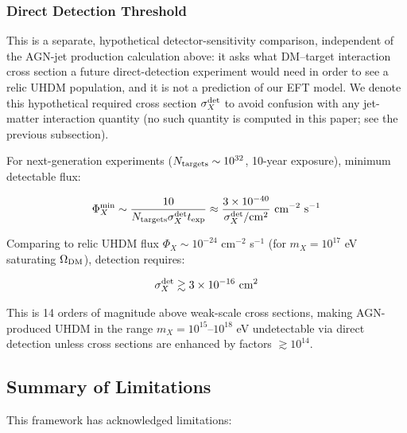 \documentclass[twocolumn,superscriptaddress,prd,nofootinbib]{revtex4-2}
\begin{document}
\subsubsection{Direct Detection Threshold}

This is a separate, hypothetical detector-sensitivity comparison, independent of the AGN-jet production calculation above: it asks what DM--target interaction cross section a future direct-detection experiment would need in order to see a relic UHDM population, and it is not a prediction of our EFT model. We denote this hypothetical required cross section $\sigma_X^{\rm det}$ to avoid confusion with any jet-matter interaction quantity (no such quantity is computed in this paper; see the previous subsection).

For next-generation experiments ($N_{\rm targets} \sim 10^{32}$, 10-year exposure), minimum detectable flux:

\begin{equation}
\Phi_X^{\rm min} \sim \frac{10}{N_{\rm targets} \sigma_X^{\rm det} t_{\rm exp}} \approx \frac{3 \times 10^{-40}}{\sigma_X^{\rm det}/{\rm cm}^2} \text{ cm}^{-2} \text{ s}^{-1}
\label{eq:flux_threshold}
\end{equation}

Comparing to relic UHDM flux $\Phi_X \sim 10^{-24}$ cm$^{-2}$ s$^{-1}$ (for $m_X = 10^{17}$ eV saturating $\Omega_{\rm DM}$), detection requires:

\begin{equation}
\sigma_X^{\rm det} \gtrsim 3 \times 10^{-16} \text{ cm}^2
\label{eq:sigma_threshold}
\end{equation}

This is 14 orders of magnitude above weak-scale cross sections, making AGN-produced UHDM in the range $m_X = 10^{15}$--$10^{18}$ eV undetectable via direct detection unless cross sections are enhanced by factors $\gtrsim 10^{14}$.

\subsection{Summary of Limitations}

This framework has acknowledged limitations:
\end{document}

